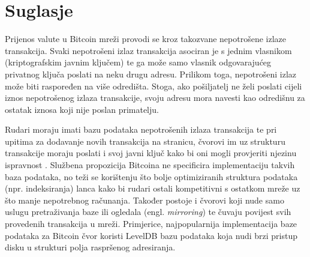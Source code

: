 \documentclass[utf8, zavrsni]{fer}
\begin{document}
\section{Suglasje}
Prijenos valute u Bitcoin mreži provodi se kroz takozvane nepotrošene izlaze transakcija\footnotemark. Svaki nepotrošeni izlaz transakcija asociran je s jednim vlasnikom (kriptografskim javnim ključem) te ga može samo vlasnik odgovarajućeg privatnog ključa poslati na neku drugu adresu. Prilikom toga, nepotrošeni izlaz može biti raspoređen na više odredišta. Stoga, ako pošiljatelj ne želi poslati cijeli iznos nepotrošenog izlaza transakcije, svoju adresu mora navesti kao odredišnu za ostatak iznosa koji nije poslan primatelju.

Rudari moraju imati bazu podataka nepotrošenih izlaza transakcija te pri upitima za dodavanje novih transakcija na stranicu, čvorovi im uz strukturu transakcije moraju poslati i svoj javni ključ kako bi oni mogli provjeriti njezinu ispravnost \footnotemark. Službena propozicija Bitcoina ne specificira implementaciju takvih baza podataka, no teži se korištenju što bolje optimiziranih struktura podataka (npr. indeksiranja) lanca kako bi rudari ostali kompetitivni s ostatkom mreže uz što manje nepotrebnog računanja. Također postoje i čvorovi koji nude samo uslugu pretraživanja baze ili ogledala (engl. \textit{mirroring}) te čuvaju povijest svih provedenih transakcija u mreži. Primjerice, najpopularnija implementacija baze podataka za Bitcoin čvor koristi LevelDB bazu podataka koja nudi brzi pristup disku u strukturi polja raspršenog adresiranja.
\end{document}
